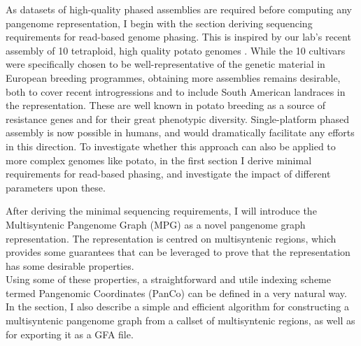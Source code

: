 %
%
%



As datasets of high-quality phased assemblies are required before computing any pangenome representation, I begin with the section deriving sequencing requirements for read-based genome phasing. %
This is inspired by our lab's recent assembly of 10 tetraploid, high quality potato genomes \cite{sun25}.
While the 10 cultivars were specifically chosen to be well-representative of the genetic material in European breeding programmes, obtaining more assemblies remains desirable, both to cover recent introgressions and to include South American landraces in the representation.
These are well known in potato breeding as a source of resistance genes and for their great phenotypic diversity\cite{bradshaw22}.
Single-platform phased assembly is now possible in humans, and would dramatically facilitate any efforts in this direction.
To investigate whether this approach can also be applied to more complex genomes like potato, in the first section I derive minimal requirements for read-based phasing, and investigate the impact of different parameters upon these. %

After deriving the minimal sequencing requirements, I will introduce the Multisyntenic Pangenome Graph (MPG) as a novel pangenome graph representation.
The representation is centred on multisyntenic regions, which provides some guarantees that can be leveraged to prove that the representation has some desirable properties.\\
Using some of these properties, a straightforward and utile indexing scheme termed Pangenomic Coordinates (PanCo) can be defined in a very natural way.
In the section, I also describe a simple and efficient algorithm for constructing a multisyntenic pangenome graph from a callset of multisyntenic regions, as well as for exporting it as a GFA file. %

